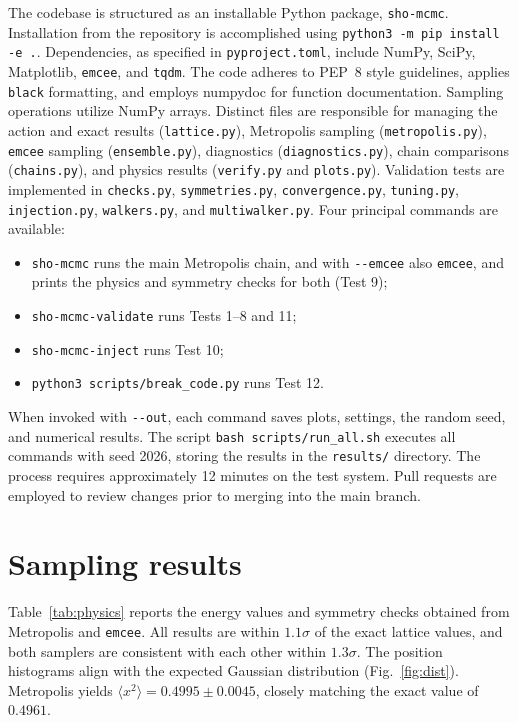 \documentclass[11pt]{article}
\begin{document}
The codebase is structured as an installable Python package,
\texttt{sho-mcmc}. Installation from the repository is accomplished using
\texttt{python3 -m pip install -e .}. Dependencies, as specified in
\texttt{pyproject.toml}, include NumPy, SciPy, Matplotlib, \texttt{emcee}, and
\texttt{tqdm}. The code adheres to PEP~8 style guidelines, applies
\texttt{black} formatting, and employs numpydoc for function documentation.
Sampling operations utilize NumPy arrays. Distinct files are responsible for
managing the action and exact results (\texttt{lattice.py}), Metropolis
sampling (\texttt{metropolis.py}), \texttt{emcee} sampling
(\texttt{ensemble.py}), diagnostics (\texttt{diagnostics.py}), chain
comparisons (\texttt{chains.py}), and physics results (\texttt{verify.py} and
\texttt{plots.py}). Validation tests are implemented in \texttt{checks.py},
\texttt{symmetries.py}, \texttt{convergence.py}, \texttt{tuning.py},
\texttt{injection.py}, \texttt{walkers.py}, and \texttt{multiwalker.py}. Four
principal commands are available:
\begin{itemize}
  \item \texttt{sho-mcmc} runs the main Metropolis chain, and with
    \texttt{-{}-emcee} also \texttt{emcee}, and prints the physics and
    symmetry checks for both (Test 9);
  \item \texttt{sho-mcmc-validate} runs Tests 1--8 and 11;
  \item \texttt{sho-mcmc-inject} runs Test 10;
  \item \texttt{python3 scripts/break\_code.py} runs Test 12.
\end{itemize}
When invoked with \texttt{-{}-out}, each command saves plots, settings, the
random seed, and numerical results. The script \texttt{bash
scripts/run\_all.sh} executes all commands with seed 2026, storing the results
in the \texttt{results/} directory. The process requires approximately 12
minutes on the test system. Pull requests are employed to review changes prior
to merging into the main branch.

\section{Sampling results}\label{sec:results}

Table~\ref{tab:physics} reports the energy values and symmetry checks obtained
from Metropolis and \texttt{emcee}. All results are within $1.1\sigma$ of the
exact lattice values, and both samplers are consistent with each other within
$1.3\sigma$. The position histograms align with the expected Gaussian
distribution (Fig.~\ref{fig:dist}). Metropolis yields
$\langle x^2\rangle = 0.4995 \pm 0.0045$, closely matching the exact value of
$0.4961$.
\end{document}
